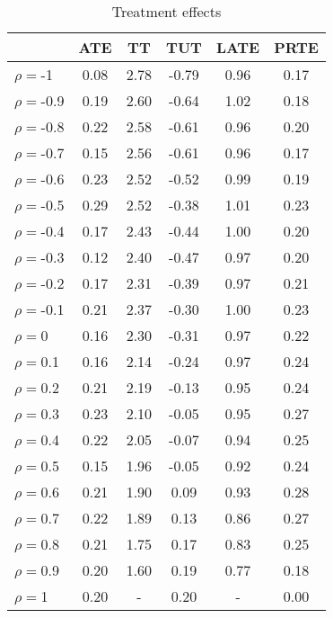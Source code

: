 \begin{table}[htb]
\centering
\caption{Treatment effects}
\label{table:te}
\begin{tabular}{lccccc}
\hline
 & ATE & TT & TUT & LATE & PRTE \\
\hline\hline
$\rho=$-1 & 0.08 & 2.78 & -0.79 & 0.96 & 0.17 \\
$\rho=$-0.9 & 0.19 & 2.60 & -0.64 & 1.02 & 0.18 \\
$\rho=$-0.8 & 0.22 & 2.58 & -0.61 & 0.96 & 0.20 \\
$\rho=$-0.7 & 0.15 & 2.56 & -0.61 & 0.96 & 0.17 \\
$\rho=$-0.6 & 0.23 & 2.52 & -0.52 & 0.99 & 0.19 \\
$\rho=$-0.5 & 0.29 & 2.52 & -0.38 & 1.01 & 0.23 \\
$\rho=$-0.4 & 0.17 & 2.43 & -0.44 & 1.00 & 0.20 \\
$\rho=$-0.3 & 0.12 & 2.40 & -0.47 & 0.97 & 0.20 \\
$\rho=$-0.2 & 0.17 & 2.31 & -0.39 & 0.97 & 0.21 \\
$\rho=$-0.1 & 0.21 & 2.37 & -0.30 & 1.00 & 0.23 \\
$\rho=$0 & 0.16 & 2.30 & -0.31 & 0.97 & 0.22 \\
$\rho=$0.1 & 0.16 & 2.14 & -0.24 & 0.97 & 0.24 \\
$\rho=$0.2 & 0.21 & 2.19 & -0.13 & 0.95 & 0.24 \\
$\rho=$0.3 & 0.23 & 2.10 & -0.05 & 0.95 & 0.27 \\
$\rho=$0.4 & 0.22 & 2.05 & -0.07 & 0.94 & 0.25 \\
$\rho=$0.5 & 0.15 & 1.96 & -0.05 & 0.92 & 0.24 \\
$\rho=$0.6 & 0.21 & 1.90 & 0.09 & 0.93 & 0.28 \\
$\rho=$0.7 & 0.22 & 1.89 & 0.13 & 0.86 & 0.27 \\
$\rho=$0.8 & 0.21 & 1.75 & 0.17 & 0.83 & 0.25 \\
$\rho=$0.9 & 0.20 & 1.60 & 0.19 & 0.77 & 0.18 \\
$\rho=$1 & 0.20 & - & 0.20 & - & 0.00 \\
\hline
\end{tabular}
\end{table}
